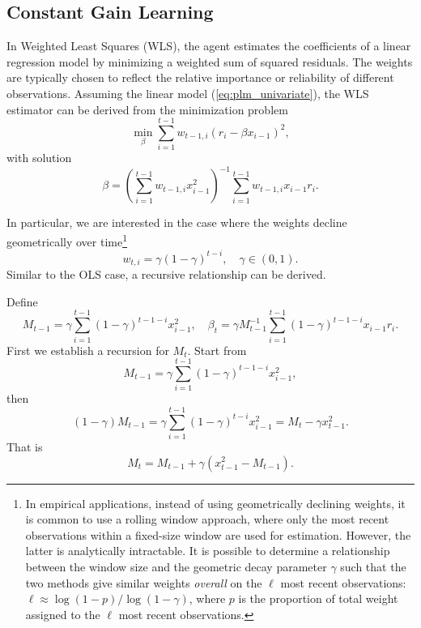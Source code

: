 \subsection{Constant Gain Learning}\label{app:WLS}
In Weighted Least Squares (WLS), the agent estimates the coefficients of a linear regression model by minimizing a weighted sum of squared residuals.
The weights are typically chosen to reflect the relative importance or reliability of different observations. Assuming the linear model (\ref{eq:plm_univariate}),
the WLS estimator can be derived from the minimization problem
\begin{equation}
    \min_{\beta} \sum^{t-1}_{i=1} {w_{t-1,i}} (r_i - \beta x_{i-1}) ^2,
\end{equation}
with solution
\begin{equation}
    {\beta} = \left(\sum^{t-1}_{i=1} {w_{t-1,i}} x_{i-1}^2 \right)^{-1} \sum^{t-1}_{i=1} {w_{t-1,i}} x_{i-1} r_i.
\end{equation}

In particular, we are interested in the case where the weights decline geometrically over time\footnote{
    In empirical applications, instead of using geometrically declining weights, it is common to use a rolling window approach, where only the most recent observations within a fixed-size window are used for estimation. 
    However, the latter is analytically intractable.
    It is possible to determine a relationship between the window size and the geometric decay parameter $\gamma$ such that the two methods give similar weights \emph{overall} on the $\ell$ most recent observations:
    $\ell \approx \log(1 - p) / \log(1 - \gamma)$, where $p$ is the proportion of total weight assigned to the $\ell$ most recent observations.
}
\begin{equation}
    w_{t,i} = \gamma (1 - \gamma)^{t-i}, \quad \gamma \in (0,1).
\end{equation}
Similar to the OLS case, a recursive relationship can be derived.

Define 
\begin{equation}
    M_{t-1} = \gamma \sum^{t-1}_{i=1} {(1 - \gamma)^{t-1-i}} x_{i-1}^2, \quad \beta_{t} = \gamma M^{-1}_{t-1} \sum^{t-1}_{i=1} {(1 - \gamma)^{t-1-i}} x_{i-1} r_i.
\end{equation}
First we establish a recursion for $M_t$. Start from
\begin{equation}
M_{t-1} = \gamma \sum^{t-1}_{i=1} {(1 - \gamma)^{t-1-i}} x_{i-1}^2,
\end{equation}
then
\begin{equation}
(1 - \gamma) M_{t-1} = \gamma \sum^{t-1}_{i=1} {(1 - \gamma)^{t-i}} x_{i-1}^2 = M_t - \gamma x_{t-1}^2.
\end{equation}
That is
\begin{equation}
    M_t = M_{t-1} + \gamma \left(x_{t-1}^2 - M_{t-1} \right).
\end{equation}

